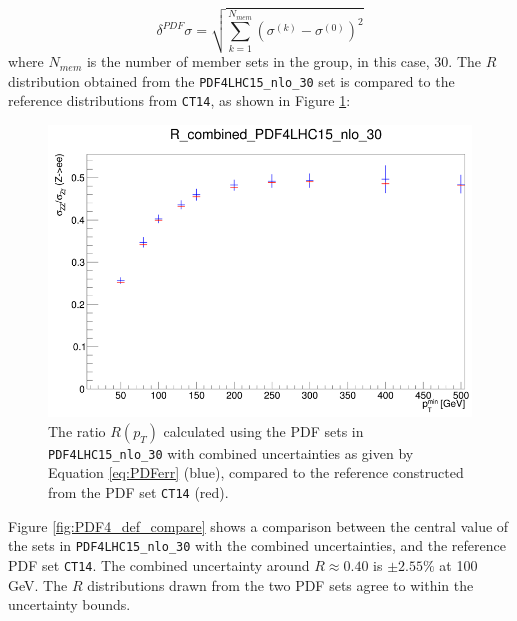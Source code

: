\documentclass[11pt,a4paper,final]{report}
\begin{document}
\begin{equation}\label{eq:PDFerr}
	\delta^{PDF}\sigma = \sqrt{\sum^{N_{mem}}_{k=1} (\sigma^{(k)} - \sigma^{(0)})^2}
\end{equation}
where $N_{mem}$ is the number of member sets in the group, in this case, 30. The $R$ distribution obtained from the \texttt{PDF4LHC15\_nlo\_30} set is compared to the reference distributions from \texttt{CT14}, as shown in Figure \ref{pdfcompare}:
\begin{figure}[H]
\centering
	\includegraphics[width = 0.55\linewidth]{PDF4_CT14_comp.png}
	\caption{The ratio $R(p_T)$ calculated using the PDF sets in \texttt{PDF4LHC15\_nlo\_30} with combined uncertainties as given by Equation \ref{eq:PDFerr} (blue), compared to the reference constructed from the PDF set \texttt{CT14} (red).}
	\label{fig:PDF4_def_compare}
	\label{pdfcompare}
\end{figure}
\noindent Figure \ref{fig:PDF4_def_compare} shows a comparison between the central value of the sets in \texttt{PDF4LHC15\_nlo\_30} with the combined uncertainties, and the reference PDF set \texttt{CT14}. The combined uncertainty around $R \approx 0.40$ is $\pm 2.55\%$ at 100 GeV. The $R$ distributions drawn from the two PDF sets agree to within the uncertainty bounds.

\end{document}
